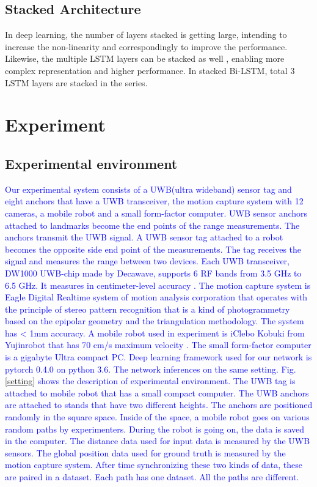 \documentclass[letterpaper, 10 pt, conference]{ieeeconf}  %
\begin{document}
\subsection{Stacked Architecture}

In deep learning, the number of layers stacked is getting large, intending to increase the non-linearity and correspondingly to improve the performance. Likewise, the multiple LSTM layers can be stacked as well \cite{dyer2015transition}, enabling more complex representation and higher performance. In stacked Bi-LSTM, total 3 LSTM layers are stacked in the series. 


\section{Experiment}


\subsection{Experimental environment} 

 \textcolor{blue}{Our experimental system consists of a UWB(ultra wideband) sensor tag and eight anchors that have a UWB transceiver, the motion capture system with 12 cameras, a mobile robot and a small form-factor computer. UWB sensor anchors attached to landmarks become the end points of the range measurements. The anchors transmit the UWB signal. A UWB sensor tag attached to a robot becomes the opposite side end point of the measurements. The tag receives the signal and measures the range between two devices. Each UWB transceiver, DW1000 UWB-chip made by Decawave, supports 6 RF bands from 3.5 GHz to 6.5 GHz. It measures in centimeter-level accuracy . The motion capture system is Eagle Digital Realtime system of motion analysis corporation that operates with the principle of stereo pattern recognition that is a kind of photogrammetry based on the epipolar geometry and the triangulation methodology. The system has < 1mm accuracy. A mobile robot used in experiment is iClebo Kobuki from Yujinrobot that has 70 cm/s maximum velocity . The small form-factor computer is a gigabyte Ultra compact PC. Deep learning framework used for our network is pytorch 0.4.0 on python 3.6. The network inferences on the same setting.
 Fig. \ref{setting} shows the description of experimental environment. The UWB tag is attached to mobile robot that has a small compact computer. The UWB anchors are attached to stands that have two different heights. The anchors are positioned randomly in the square space. Inside of the space, a mobile robot goes on various random paths by experimenters. During the robot is going on, the data is saved in the computer. The distance data used for input data is measured by the UWB sensors. The global position data used for ground truth is measured by the motion capture system. After time synchronizing these two kinds of data, these are paired in a dataset. Each path has one dataset. All the paths are different.}
\end{document}

